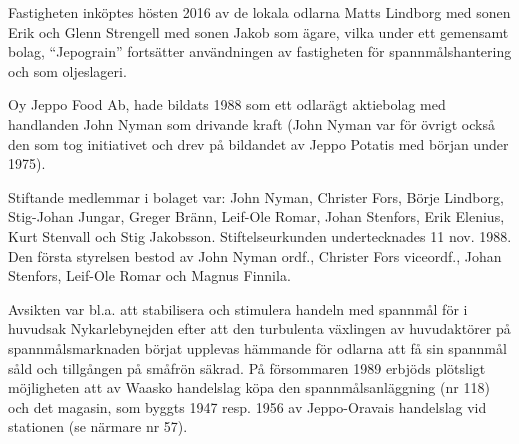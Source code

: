 





Fastigheten inköptes hösten 2016 av de lokala odlarna Matts Lindborg med sonen Erik och Glenn Strengell med sonen Jakob som ägare, vilka under ett gemensamt bolag, ``Jepograin'' fortsätter användningen av fastigheten för spannmålshantering och som oljeslageri.



Oy Jeppo Food Ab, hade bildats 1988 som ett odlarägt aktiebolag med handlanden John Nyman som drivande kraft (John Nyman var för övrigt också den som tog initiativet och drev på bildandet av Jeppo Potatis med början under 1975).

Stiftande medlemmar i bolaget var: John Nyman, Christer Fors, Börje Lindborg, Stig-Johan Jungar, Greger Bränn, Leif-Ole Romar, Johan Stenfors, Erik Elenius, Kurt Stenvall och Stig Jakobsson. Stiftelseurkunden undertecknades 11 nov. 1988. Den första styrelsen bestod av John Nyman ordf., Christer Fors viceordf., Johan Stenfors, Leif-Ole Romar och Magnus Finnila.

Avsikten var bl.a. att stabilisera och stimulera handeln med spannmål för i huvudsak Nykarlebynejden efter att den turbulenta växlingen av huvudaktörer på spannmålsmarknaden börjat upplevas hämmande för odlarna att få sin spannmål såld och tillgången på småfrön säkrad. På försommaren 1989 erbjöds plötsligt möjligheten att av Waasko handelslag köpa den spannmålsanläggning (nr 118) och det magasin, som byggts 1947 resp. 1956 av Jeppo-Oravais handelslag vid stationen (se närmare nr 57).


